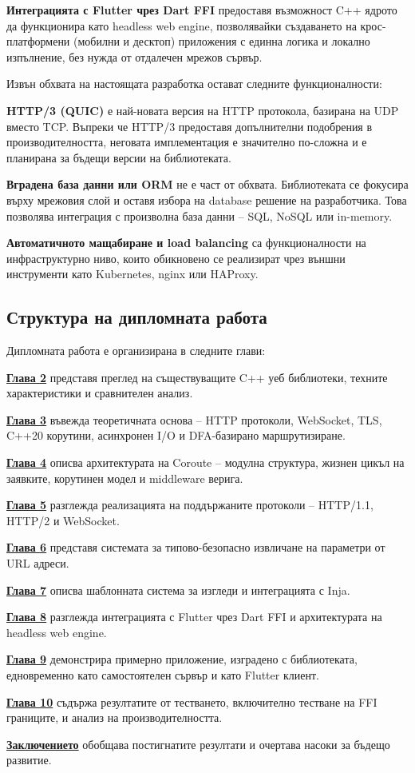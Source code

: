 \textbf{Интеграцията с Flutter чрез Dart FFI} предоставя възможност C++ ядрото да функционира като headless web engine, позволявайки създаването на крос-платформени (мобилни и десктоп) приложения с единна логика и локално изпълнение, без нужда от отдалечен мрежов сървър.

Извън обхвата на настоящата разработка остават следните функционалности:

\textbf{HTTP/3 (QUIC)} е най-новата версия на HTTP протокола, базирана на UDP вместо TCP. Въпреки че HTTP/3 предоставя допълнителни подобрения в производителността, неговата имплементация е значително по-сложна и е планирана за бъдещи версии на библиотеката.

\textbf{Вградена база данни или ORM} не е част от обхвата. Библиотеката се фокусира върху мрежовия слой и оставя избора на database решение на разработчика. Това позволява интеграция с произволна база данни -- SQL, NoSQL или in-memory.

\textbf{Автоматичното мащабиране и load balancing} са функционалности на инфраструктурно ниво, които обикновено се реализират чрез външни инструменти като Kubernetes, nginx или HAProxy.

\subsection{Структура на дипломната работа}

Дипломната работа е организирана в следните глави:

\textbf{\hyperref[sec:existing_solutions]{Глава 2}} представя преглед на съществуващите C++ уеб библиотеки, техните характеристики и сравнителен анализ.

\textbf{\hyperref[sec:theoretical_background]{Глава 3}} въвежда теоретичната основа -- HTTP протоколи, WebSocket, TLS, C++20 корутини, асинхронен I/O и DFA-базирано маршрутизиране.

\textbf{\hyperref[sec:architecture]{Глава 4}} описва архитектурата на Coroute -- модулна структура, жизнен цикъл на заявките, корутинен модел и middleware верига.

\textbf{\hyperref[sec:protocols]{Глава 5}} разглежда реализацията на поддържаните протоколи -- HTTP/1.1, HTTP/2 и WebSocket.

\textbf{\hyperref[sec:type_safe_params]{Глава 6}} представя системата за типово-безопасно извличане на параметри от URL адреси.

\textbf{\hyperref[sec:views_templating]{Глава 7}} описва шаблонната система за изгледи и интеграцията с Inja.

\textbf{\hyperref[sec:flutter_integration]{Глава 8}} разглежда интеграцията с Flutter чрез Dart FFI и архитектурата на headless web engine.

\textbf{\hyperref[sec:example_app]{Глава 9}} демонстрира примерно приложение, изградено с библиотеката, едновременно като самостоятелен сървър и като Flutter клиент.

\textbf{\hyperref[sec:testing]{Глава 10}} съдържа резултатите от тестването, включително тестване на FFI границите, и анализ на производителността.

\textbf{\hyperref[sec:conclusion]{Заключението}} обобщава постигнатите резултати и очертава насоки за бъдещо развитие.
